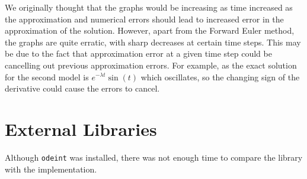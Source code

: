 \documentclass[letterpaper,12pt]{article}
\begin{document}
We originally thought that the graphs would be increasing as time increased as the approximation  and numerical errors should lead to increased error in the approximation of the solution. However, apart from the Forward Euler method, the graphs are quite erratic, with sharp decreases at certain time steps. This may be due to the fact that approximation error at a given time step could be cancelling out previous approximation errors. For example, as the exact solution for the second model is $e^{-\lambda t } \sin(t)$ which oscillates, so the changing sign of the derivative could cause the errors to cancel. 


\section{External Libraries}

Although \texttt{odeint} was installed, there was not enough time to compare the library with the implementation.
\end{document}
